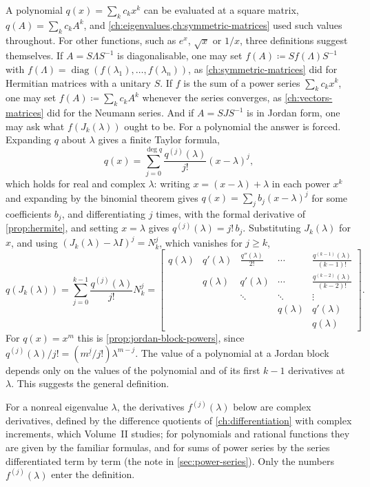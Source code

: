 A polynomial $q(x)=\sum_kc_kx^k$ can be evaluated at a square matrix, $q(A)=\sum_kc_kA^k$, and \cref{ch:eigenvalues,ch:symmetric-matrices} used such values throughout. For other functions, such as $e^x$, $\sqrt x$ or $1/x$, three definitions suggest themselves. If $A=S\Lambda S^{-1}$ is diagonalisable, one may set $f(A)\coloneqq Sf(\Lambda)S^{-1}$ with $f(\Lambda)=\operatorname{diag}(f(\lambda_1),\ldots,f(\lambda_n))$, as \cref{ch:symmetric-matrices} did for Hermitian matrices with a unitary $S$. If $f$ is the sum of a power series $\sum_kc_kx^k$, one may set $f(A)\coloneqq\sum_kc_kA^k$ whenever the series converges, as \cref{ch:vectors-matrices} did for the Neumann series. And if $A=SJS^{-1}$ is in Jordan form, one may ask what $f(J_k(\lambda))$ ought to be. For a polynomial the answer is forced. Expanding $q$ about $\lambda$ gives a finite Taylor formula,
\begin{equation}
q(x)=\sum_{j=0}^{\deg q}\frac{q^{(j)}(\lambda)}{j!}(x-\lambda)^j ,
\label{eq:polynomial-taylor}
\end{equation}
which holds for real and complex $\lambda$: writing $x=(x-\lambda)+\lambda$ in each power $x^k$ and expanding by the binomial theorem gives $q(x)=\sum_jb_j(x-\lambda)^j$ for some coefficients $b_j$, and differentiating $j$ times, with the formal derivative of \cref{prop:hermite}, and setting $x=\lambda$ gives $q^{(j)}(\lambda)=j!\,b_j$. Substituting $J_k(\lambda)$ for $x$, and using $(J_k(\lambda)-\lambda I)^j=N_k^j$, which vanishes for $j\ge k$,
\begin{equation}
q(J_k(\lambda))=\sum_{j=0}^{k-1}\frac{q^{(j)}(\lambda)}{j!}N_k^j=\begin{bmatrix}q(\lambda)&q'(\lambda)&\frac{q''(\lambda)}{2!}&\cdots&\frac{q^{(k-1)}(\lambda)}{(k-1)!}\\&q(\lambda)&q'(\lambda)&\cdots&\frac{q^{(k-2)}(\lambda)}{(k-2)!}\\&&\ddots&\ddots&\vdots\\&&&q(\lambda)&q'(\lambda)\\&&&&q(\lambda)\end{bmatrix}.
\label{eq:polynomial-jordan}
\end{equation}
For $q(x)=x^m$ this is \cref{prop:jordan-block-powers}, since $q^{(j)}(\lambda)/j!=(m^{\underline j}/j!)\lambda^{m-j}$. The value of a polynomial at a Jordan block depends only on the values of the polynomial and of its first $k-1$ derivatives at $\lambda$. This suggests the general definition.

For a nonreal eigenvalue $\lambda$, the derivatives $f^{(j)}(\lambda)$ below are complex derivatives, defined by the difference quotients of \cref{ch:differentiation} with complex increments, which Volume~II studies; for polynomials and rational functions they are given by the familiar formulas, and for sums of power series by the series differentiated term by term (the note in \cref{sec:power-series}). Only the numbers $f^{(j)}(\lambda)$ enter the definition.

